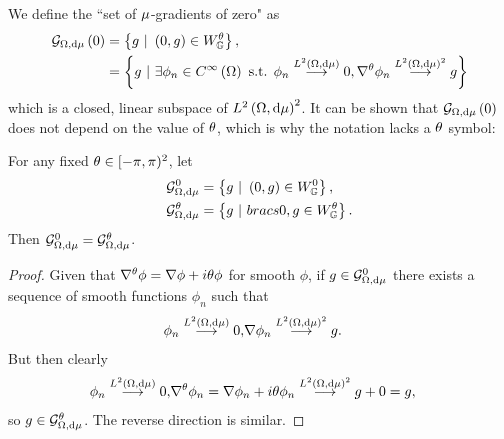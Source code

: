 We define the ``set of $\mu$-gradients of zero" as
\begin{align} \label{eq:GradZeroDef}
	\mathcal{G}_{ \Omega, \mathrm{d}\mu}\left( 0 \right) &= \left\{  g \ \vert \ \left( 0,g \right)\in W^{\theta}_{\mathbb{G}}  \right\}, \\
	&= \left\{  g \ \vert \ \exists\phi_n\in C^{\infty}\left( \Omega \right) \text{ s.t. } \phi_n\overset{L^{2}\left( \Omega,\mathrm{d}\mu \right)}{\longrightarrow}0, \nabla^{\theta}\phi_n\overset{L^{2}\left( \Omega,\mathrm{d}\mu \right)^2}{\longrightarrow}g  \right\}
\end{align}
which is a closed, linear subspace of $L^{2}\left( \Omega,\mathrm{d}\mu \right)^2$.
It can be shown that $\mathcal{G}_{ \Omega, \mathrm{d}\mu}\left( 0 \right)$ does not depend on the value of $\theta$, which is why the notation lacks a $\theta$ symbol:
\begin{prop} \label{prop:GradZeroInvarientUnderQM}
	For any fixed $\theta\in[-\pi,\pi)^2$, let 
	\begin{align*}
		\mathcal{G}^0_{\ddom, \md \ddmes} &= \clbracs{ g \ \vert \ \bracs{0,g}\in W^0_\graph}, \\
		\mathcal{G}^{\qm}_{\ddom, \md \ddmes} &= \clbracs{ g \ \vert \ bracs{0,g}\in W^{\qm}_\graph }.
	\end{align*}
	Then $\mathcal{G}^0_{\Omega, \mathrm{d} \mu} = \mathcal{G}^{\theta}_{\Omega, \mathrm{d} \mu}$.
\end{prop}
\begin{proof}
	Given that $\nabla^{\theta}\phi = \nabla\phi + i\theta\phi$ for smooth $\phi$, if $g\in\mathcal{G}^0_{\Omega, \mathrm{d} \mu}$ there exists a sequence of smooth functions $\phi_n$ such that 
	\begin{align*}
		\phi_n\overset{L^{2}\left( \Omega,\mathrm{d}\mu \right)}{\longrightarrow}0, &\nabla\phi_n\overset{L^{2}\left( \Omega,\mathrm{d}\mu \right)^2}{\longrightarrow}g.
	\end{align*}
	But then clearly
	\begin{align*}
		\phi_n\overset{L^{2}\left( \Omega,\mathrm{d}\mu \right)}{\longrightarrow}0, &\nabla^{\theta}\phi_n = \nabla\phi_n + i\theta\phi_n \overset{L^{2}\left( \Omega,\mathrm{d}\mu \right)^2}{\longrightarrow} g + 0 = g,
	\end{align*}
	so $g\in\mathcal{G}^\theta_{\Omega, \mathrm{d} \mu}$.
	The reverse direction is similar.
\end{proof}

